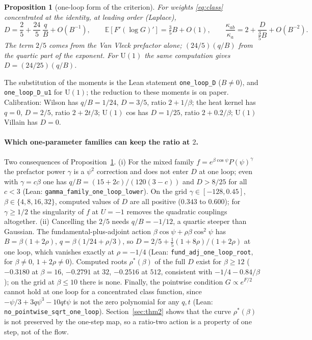 \documentclass[11pt,a4paper]{article}
\newtheorem{proposition}[lemma]{Proposition}
\theoremstyle{definition}
\theoremstyle{remark}
\newcommand{\E}{\mathbb{E}}
\newcommand{\code}[1]{\texttt{#1}}
\begin{document}
\begin{proposition}[one-loop form of the criterion]\label{prop:D}
For weights \eqref{eq:class} concentrated at the identity, at leading order (Laplace),
\[
D=\frac25+\frac{24}{5}\,\frac{q}{B}+O(B^{-1}),\qquad \E[F'(\log G)']=\tfrac35B+O(1),\qquad \frac{\kappa_{ab}}{\kappa_a}=2+\frac{D}{\frac35B}+O(B^{-2}).
\]
The term $2/5$ comes from the Van Vleck prefactor alone; $(24/5)(q/B)$ from the quartic part of the exponent.
For $\mathrm{U}(1)$ the same computation gives $D=(24/25)(q/B)$.
\end{proposition}

The substitution of the moments is the Lean statement \code{one\_loop\_D} ($B\ne0$), and \code{one\_loop\_D\_u1} for $\mathrm{U}(1)$; the reduction to these moments is on paper.
Calibration: Wilson has $q/B=1/24$, $D=3/5$, ratio $2+1/\beta$; the heat kernel has $q=0$, $D=2/5$, ratio $2+2t/3$; $\mathrm{U}(1)$ cos has $D=1/25$, ratio $2+0.2/\beta$; $\mathrm{U}(1)$ Villain has $D=0$.

\paragraph{Which one-parameter families can keep the ratio at $2$.}
Two consequences of Proposition~\ref{prop:D}.
(i) For the mixed family $f=e^{\beta\cos\psi}P(\psi)^\gamma$ the prefactor power $\gamma$ is a $\psi^2$ correction and does not enter $D$ at one loop; even with $\gamma=c\beta$ one has $q/B=(15+2c)/(120(3-c))$ and $D>8/25$ for all $c<3$ (Lean: \code{gamma\_family\_one\_loop\_lower}).
On the grid $\gamma\in[-128,0.45]$, $\beta\in\{4,8,16,32\}$, computed values of $D$ are all positive ($0.343$ to $0.600$); for $\gamma\ge1/2$ the singularity of $f$ at $U=-1$ removes the quadratic couplings altogether.
(ii) Cancelling the $2/5$ needs $q/B=-1/12$, a quartic steeper than Gaussian.
The fundamental-plus-adjoint action $\beta\cos\psi+\rho\beta\cos^2\psi$ has $B=\beta(1+2\rho)$, $q=\beta(1/24+\rho/3)$, so $D=2/5+\tfrac15(1+8\rho)/(1+2\rho)$ at one loop, which vanishes exactly at $\rho=-1/4$ (Lean: \code{fund\_adj\_one\_loop\_root}, for $\beta\ne0$, $1+2\rho\ne0$).
Computed roots $\rho^*(\beta)$ of the full $D$ exist for $\beta\ge12$ ($-0.3180$ at $\beta=16$, $-0.2791$ at $32$, $-0.2516$ at $512$, consistent with $-1/4-0.84/\beta$); on the grid at $\beta\le10$ there is none.
Finally, the pointwise condition $G\propto e^{F/2}$ cannot hold at one loop for a concentrated class function, since $-\psi/3+3q\psi^3-10qt\psi$ is not the zero polynomial for any $q,t$ (Lean: \code{no\_pointwise\_sqrt\_one\_loop}).
Section~\ref{sec:thm2} shows that the curve $\rho^*(\beta)$ is not preserved by the one-step map, so a ratio-two action is a property of one step, not of the flow.
\end{document}
